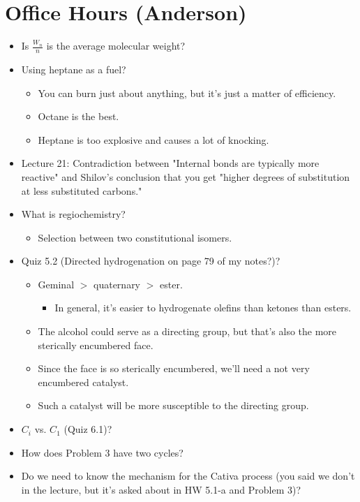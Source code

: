 \documentclass[../notes.tex]{subfiles}
\begin{document}
\section{Office Hours (Anderson)}
\begin{itemize}
    \item Is $\frac{W_n}{n}$ is the average molecular weight?
    \item Using heptane as a fuel?
    \begin{itemize}
        \item You can burn just about anything, but it's just a matter of efficiency.
        \item Octane is the best.
        \item Heptane is too explosive and causes a lot of knocking.
    \end{itemize}
    \item Lecture 21: Contradiction between "Internal  bonds are typically more reactive" and Shilov's conclusion that you get "higher degrees of substitution at less substituted carbons."
    \item What is regiochemistry?
    \begin{itemize}
        \item Selection between two constitutional isomers.
    \end{itemize}
    \item Quiz 5.2 (Directed hydrogenation on page 79 of my notes?)?
    \begin{itemize}
        \item Geminal $>$ quaternary $>$ ester.
        \begin{itemize}
            \item In general, it's easier to hydrogenate olefins than ketones than esters.
        \end{itemize}
        \item The alcohol could serve as a directing group, but that's also the more sterically encumbered face.
        \item Since the face is so sterically encumbered, we'll need a not very encumbered catalyst.
        \item Such a catalyst will be more susceptible to the directing group.
    \end{itemize}
    \item $C_i$ vs. $C_1$ (Quiz 6.1)?
    \item How does Problem 3 have two cycles?
    \item Do we need to know the mechanism for the Cativa process (you said we don't in the lecture, but it's asked about in HW 5.1-a and Problem 3)?

\end{itemize}
\end{document}
